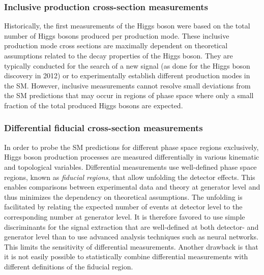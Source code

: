 \subsubsection{Inclusive production cross-section measurements}
Historically, the first measurements of the Higgs boson were based on the total number of Higgs bosons produced per production mode.
These inclusive production mode cross sections are maximally dependent on theoretical assumptions related to the decay properties of the Higgs boson.
They are typically conducted for the search of a new signal (as done for the Higgs boson discovery in 2012) or to experimentally establish different production modes in the SM.
However, inclusive measurements cannot resolve small deviations from the SM predictions that may occur in regions of phase space where only a small fraction of the total produced Higgs bosons are expected.

\subsubsection{Differential fiducial cross-section measurements}
In order to probe the SM predictions for different phase space regions exclusively, Higgs boson production processes are measured differentially in various kinematic and topological variables.
Differential measurements use well-defined phase space regions, known as \emph{fiducial regions}, that allow unfolding the detector effects. 
This enables comparisons between experimental data and theory at generator level and thus minimizes the dependency on theoretical assumptions. 
The unfolding is facilitated by relating the expected number of events at detector level to the corresponding number at generator level. It is therefore favored to use simple discriminants for the signal extraction that are well-defined at both detector- and generator level than to use advanced analysis techniques such as neural networks. 
This limits the sensitivity of differential measurements.
Another drawback is that it is not easily possible to statistically combine differential measurements with different definitions of the fiducial region.  



